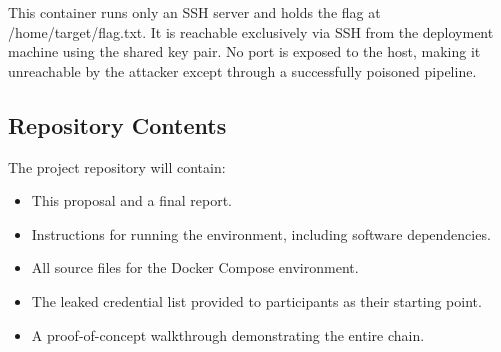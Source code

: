 \documentclass{article}
\begin{document}
This container runs only an SSH server and holds the flag at /home/target/flag.txt. It is reachable exclusively via SSH from the deployment machine using the shared key pair. No port is exposed to the host, making it unreachable by the attacker except through a successfully poisoned pipeline.

\subsection{Repository Contents}

The project repository will contain:

\begin{itemize}
    \item This proposal and a final report.
    \item Instructions for running the environment, including software dependencies.
    \item All source files for the Docker Compose environment.
    \item The leaked credential list provided to participants as their starting point.
    \item A proof-of-concept walkthrough demonstrating the entire chain.
\end{itemize}



\end{document}
